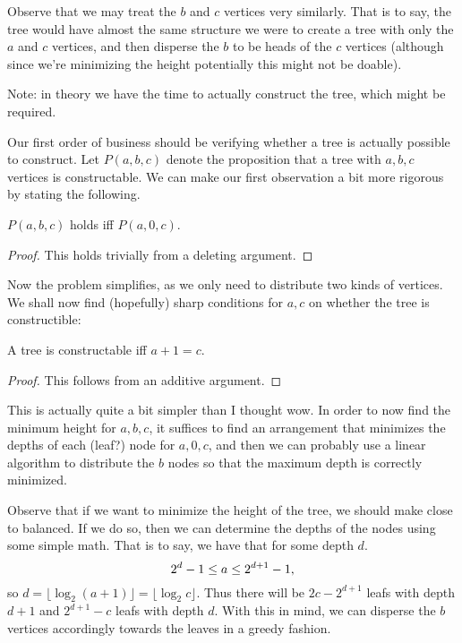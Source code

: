\documentclass[a4paper, 12pt]{article}
\begin{document}
\begin{solution}
    Observe that we may treat the \( b \) and \( c \) vertices very similarly. That is to say, the tree would have almost the same structure we were to create a tree with only the \( a \) and \( c \) vertices, and then disperse the \( b \) to be heads of the \( c \) vertices (although since we're minimizing the height potentially this might not be doable).

    Note: in theory we have the time to actually construct the tree, which might be required.

    Our first order of business should be verifying whether a tree is actually possible to construct. Let \( P (a, b, c) \) denote the proposition that a tree with \( a, b, c \) vertices is constructable. We can make our first observation a bit more rigorous by stating the following.
    \begin{claim}
        \( P(a, b, c) \) holds iff \( P(a, 0, c) \).
    \end{claim}
    \begin{proof}
        This holds trivially from a deleting argument.
    \end{proof}
    Now the problem simplifies, as we only need to distribute two kinds of vertices. We shall now find (hopefully) sharp conditions for \( a,c \) on whether the tree is constructible:
    \begin{claim}
        A tree is constructable iff \( a + 1 = c \).
    \end{claim}
    \begin{proof}
        This follows from an additive argument.
    \end{proof}
    This is actually quite a bit simpler than I thought wow. In order to now find the minimum height for \( a, b, c \), it suffices to find an arrangement that minimizes the depths of each (leaf?) node for \( a, 0, c \), and then we can probably use a linear algorithm to distribute the \( b \) nodes so that the maximum depth is correctly minimized.

    Observe that if we want to minimize the height of the tree, we should make close to balanced. If we do so, then we can determine the depths of the nodes using some simple math. That is to say, we have that for some depth \( d \).
    \[
        2^d - 1 \le a \le 2^{d + 1} - 1 \\
    ,\]
    so \( d = \lfloor \log_2{(a + 1)} \rfloor = \lfloor \log_2{c} \rfloor \). Thus there will be \( 2c - 2^{d + 1} \) leafs with depth \( d + 1 \) and \( 2^{d+1} - c \) leafs with depth \( d \). With this in mind, we can disperse the \( b \) vertices accordingly towards the leaves in a greedy fashion.
\end{solution}
\end{document}
